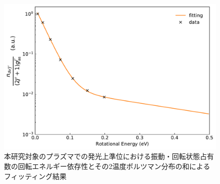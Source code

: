 \begin{figure}
    \centering
    \includegraphics[width=15cm]{pictures/upper-two-fitting.pdf}
    \caption[本研究対象のプラズマでの発光上準位($v'=0$)における振動・回転状態占有率の回転エネルギー依存性とその2温度ボルツマン分布の和によるフィッティング結果]{本研究対象のプラズマでの発光上準位における振動・回転状態占有数の回転エネルギー依存性とその2温度ボルツマン分布の和によるフィッティング結果}
    \label{fig:upper-two-fitting}
\end{figure}
